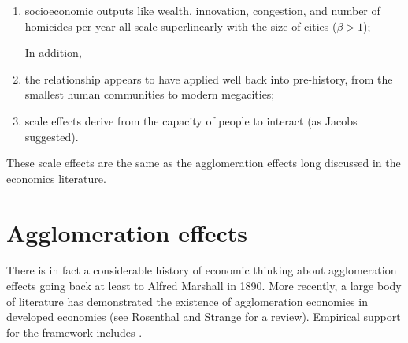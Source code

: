 \begin{enumerate}
 \item socioeconomic outputs like wealth, innovation, congestion, and number of homicides per year all scale superlinearly with the size of cities ($\beta > 1$); \cite{gomez-lievanoStatisticsUrbanScaling2012}
\vspace{.25cm}
 

 \hspace{-1cm}In addition, 
\item the relationship appears to have applied well back into pre-history, from the smallest human communities to modern megacities; %
\item scale effects derive from the capacity of people to interact (as Jacobs suggested).
\end{enumerate}

These scale effects are the same as the agglomeration effects long discussed in the economics literature.


\section{Agglomeration effects}
There is in fact a considerable history of economic thinking about agglomeration effects going back at least to  Alfred Marshall in 1890.\cite{giddingsPRINCIPLESECONOMICSAlfred1890} %
More recently, a large body of literature has demonstrated the existence of agglomeration economies in developed economies (see Rosenthal and Strange \cite{rosenthalEvidenceNatureSources2004} for a review). Empirical support for the framework includes \cite{spenceUrbanizationGrowth2009, durantonAreCitiesEngines2009, durantonHumanCapitalExternalities2007}. 

